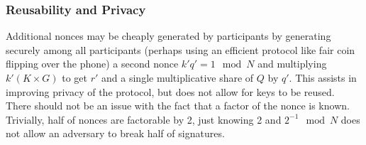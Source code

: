 \documentclass{article}
\newcommand{\mulOT}{\pi_{*}}
\begin{document}
\begin{comment}
Next, we compute the inverse as a secret share using Oblivious Transfer Multiplication.
\begin{equation*}
    \begin{split}
        Q = K^{-1} &= \prod_{i=1}^n q_i \\
        &= q_1\cdot q_2  \prod_{i=3}^n q_i\\ 
        &= \mulOT(q_1, q_2) \prod_{i=3}^n q_i \\
        &= (\tau_1 + \tau_2) \prod_{i=3}^n q_i \\
        &= \mulOT(\tau_1, q_3) \prod_{i=4}^n q_i + \mulOT(\tau_2, q_3) \prod_{i=4}^n q_i \\
        &= (\gamma_1 + \gamma_2) \prod_{i=4}^n q_i + (\gamma_3 + \gamma_4) \prod_{i=4}^n q_i\\
        &= \gamma_1  \prod_{i=4}^n q_i+ \gamma_3  \prod_{i=4}^n q_i+ (\gamma_2 + \gamma_4) \prod_{i=4}^n q_i \\
        &\cdots \\
        &= \mu_1 + \mu_2 \ldots \mu_n
    \end{split}
\end{equation*}
 By proprerly ordering terms and aggregating shares known by a single party, we keep the total number of interactions to $O(n^2)$. Fortunately, much of this computation is parallelizable, so the total asymptotic time should be closer to $O(n)$ as we have $n$ participants.

Note that in effect, $r$ is the aggregate public key and $\mu_i$ is a secret key known only to each participant.

\end{comment}

\subsubsection{Reusability and Privacy}

Additional nonces may be cheaply generated by
participants by generating securely among all participants (perhaps using an efficient protocol like fair
coin flipping over the phone) a second nonce $k'q' = 1 \mod N$ and multiplying $k'(K\times G)$ to get
$r'$ and a single multiplicative share of $Q$ by $q'$. This assists in improving privacy of the
protocol, but does not allow for keys to be reused. There should not be an issue with the fact that a factor of the nonce is known. Trivially, half of nonces are factorable by 2, just knowing 2 and $2^{-1} \mod N$ does not allow an adversary to break half of signatures.
\end{document}
